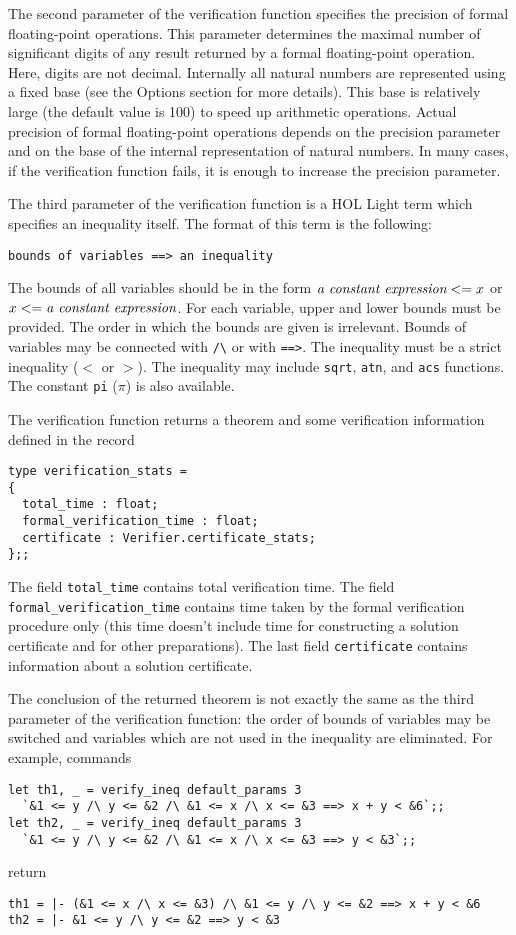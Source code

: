 \documentclass[a4paper]{article}
\begin{document}
The second parameter of the verification function specifies the precision of formal floating-point operations. This parameter determines the maximal number of significant digits of any result returned by a formal floating-point operation. Here, digits are not decimal. Internally all natural numbers are represented using a fixed base (see the Options section for more details). This base is relatively large (the default value is 100) to speed up arithmetic operations. Actual precision of formal floating-point operations depends on the precision parameter and on the base of the internal representation of natural numbers. In many cases, if the verification function fails, it is enough to increase the precision parameter.

The third parameter of the verification function is a HOL Light term which specifies an inequality itself. The format of this term is the following:
\begin{verbatim}
bounds of variables ==> an inequality
\end{verbatim}
The bounds of all variables should be in the form $\text{\it a constant expression} <= x$ or $x <= \text{\it a constant expression}$. For each variable, upper and lower bounds must be provided. The order in which the bounds are given is irrelevant. Bounds of variables may be connected with \verb|/\| or with \verb|==>|. The inequality must be a strict inequality ($<$ or $>$). The inequality may include \verb|sqrt|, \verb|atn|, and \verb|acs| functions. The constant \verb|pi| ($\pi$) is also available.

The verification function returns a theorem and some verification information defined in the record
\begin{verbatim}
type verification_stats =
{
  total_time : float;
  formal_verification_time : float;
  certificate : Verifier.certificate_stats;
};;
\end{verbatim}
The field \verb|total_time| contains total verification time. The field \verb|formal_verification_time| contains time taken by the formal verification procedure only (this time doesn't include time for constructing a solution certificate and for other preparations). The last field \verb|certificate| contains information about a solution certificate.

The conclusion of the returned theorem is not exactly the same as the third parameter of the verification function: the order of bounds of variables may be switched and variables which are not used in the inequality are eliminated. For example, commands
\begin{verbatim}
let th1, _ = verify_ineq default_params 3 
  `&1 <= y /\ y <= &2 /\ &1 <= x /\ x <= &3 ==> x + y < &6`;;
let th2, _ = verify_ineq default_params 3 
  `&1 <= y /\ y <= &2 /\ &1 <= x /\ x <= &3 ==> y < &3`;;
\end{verbatim}
return
\begin{verbatim}
th1 = |- (&1 <= x /\ x <= &3) /\ &1 <= y /\ y <= &2 ==> x + y < &6
th2 = |- &1 <= y /\ y <= &2 ==> y < &3
\end{verbatim}
\end{document}
